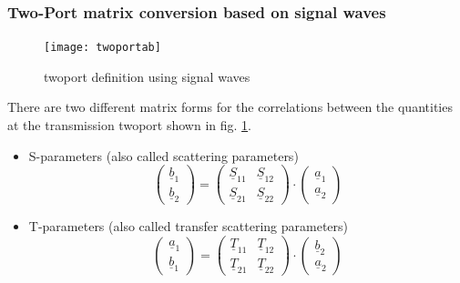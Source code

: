 \subsubsection{Two-Port matrix conversion based on signal waves}

\begin{figure}[ht]
\begin{center}
\texttt{[image: twoportab]}
\end{center}
\caption{twoport definition using signal waves}
\label{fig:twoportab}
\end{figure}
\FloatBarrier

There are two different matrix forms for the correlations between the
quantities at the transmission twoport shown in
fig. \ref{fig:twoportab}.

\begin{itemize}

\item S-parameters (also called scattering parameters)
\begin{equation}
\begin{pmatrix}
\underline{b}_{1}\\
\underline{b}_{2}
\end{pmatrix}
=
\begin{pmatrix}
\underline{S}_{11} & \underline{S}_{12}\\
\underline{S}_{21} & \underline{S}_{22}
\end{pmatrix}
\cdot
\begin{pmatrix}
\underline{a}_{1}\\
\underline{a}_{2}
\end{pmatrix}
\end{equation}

\item T-parameters (also called transfer scattering parameters)
\begin{equation}
\begin{pmatrix}
\underline{a}_{1}\\
\underline{b}_{1}
\end{pmatrix}
=
\begin{pmatrix}
\underline{T}_{11} & \underline{T}_{12}\\
\underline{T}_{21} & \underline{T}_{22}
\end{pmatrix}
\cdot
\begin{pmatrix}
\underline{b}_{2}\\
\underline{a}_{2}
\end{pmatrix}
\end{equation}

\end{itemize}

